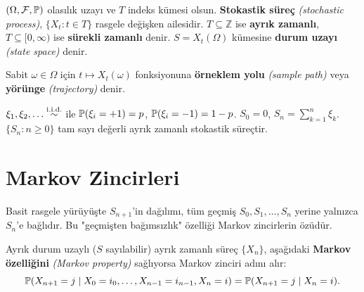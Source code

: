 \begin{tanim}\label{def:stokastik_surec}
$(\Omega,\mathcal{F},\mathbb{P})$ olasılık uzayı ve $T$ indeks kümesi olsun. \textbf{Stokastik süreç} \emph{(stochastic process)}, $\{X_t : t\in T\}$ rasgele değişken ailesidir. $T\subseteq\mathbb{Z}$ ise \textbf{ayrık zamanlı}, $T\subseteq[0,\infty)$ ise \textbf{sürekli zamanlı} denir. $S = X_t(\Omega)$ kümesine \textbf{durum uzayı} \emph{(state space)} denir.
\end{tanim}

\begin{tanim}\label{def:orneklem_yolu}
Sabit $\omega\in\Omega$ için $t\mapsto X_t(\omega)$ fonksiyonuna \textbf{örneklem yolu} \emph{(sample path)} veya \textbf{yörünge} \emph{(trajectory)} denir.
\end{tanim}

\begin{ornek}\label{ex:basit_yuruyus}
$\xi_1,\xi_2,\ldots\overset{\text{i.i.d.}}{\sim}$ ile $\mathbb{P}(\xi_i=+1)=p$, $\mathbb{P}(\xi_i=-1)=1-p$. $S_0=0$, $S_n=\sum_{k=1}^n\xi_k$. $\{S_n:n\geq0\}$ tam sayı değerli ayrık zamanlı stokastik süreçtir.
\end{ornek}

\section{Markov Zincirleri}
\label{sec:markov_zincirleri}

\begin{kesif}
Basit rasgele yürüyüşte $S_{n+1}$'in dağılımı, tüm geçmiş $S_0,S_1,\ldots,S_n$ yerine yalnızca $S_n$'e bağlıdır. Bu "geçmişten bağımsızlık" özelliği Markov zincirlerin özüdür.
\end{kesif}

\begin{tanim}\label{def:markov_zinciri}
Ayrık durum uzaylı ($S$ sayılabilir) ayrık zamanlı süreç $\{X_n\}$, aşağıdaki \textbf{Markov özelliğini} \emph{(Markov property)} sağlıyorsa Markov zinciri adını alır:
\[
  \mathbb{P}(X_{n+1}=j \mid X_0=i_0,\ldots,X_{n-1}=i_{n-1},X_n=i)
  = \mathbb{P}(X_{n+1}=j\mid X_n=i).
\]
\end{tanim}

